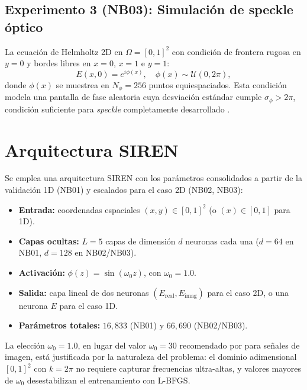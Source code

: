 \subsection{Experimento 3 (NB03): Simulación de speckle óptico}

La ecuación de Helmholtz 2D en $\Omega = [0,1]^2$ con condición de frontera
rugosa en $y = 0$ y bordes libres en $x = 0$, $x = 1$ e $y = 1$:
%
\begin{equation}
    E(x, 0) = e^{i\phi(x)}, \quad
    \phi(x) \sim \mathcal{U}(0, 2\pi),
    \label{eq:frontera_rugosa}
\end{equation}
%
donde $\phi(x)$ se muestrea en $N_\phi = 256$ puntos equiespaciados. Esta
condición modela una pantalla de fase aleatoria cuya desviación estándar cumple
$\sigma_\phi > 2\pi$, condición suficiente para \textit{speckle} completamente
desarrollado \parencite{goodman2007speckle, fang2020physics}.

\section{Arquitectura SIREN}

Se emplea una arquitectura SIREN con los parámetros consolidados a partir de la
validación 1D (NB01) y escalados para el caso 2D (NB02, NB03):

\begin{itemize}
    \item \textbf{Entrada:} coordenadas espaciales $(x, y) \in [0,1]^2$ (o
    $(x) \in [0,1]$ para 1D).
    \item \textbf{Capas ocultas:} $L = 5$ capas de dimensión $d$ neuronas cada
    una ($d = 64$ en NB01, $d = 128$ en NB02/NB03).
    \item \textbf{Activación:} $\phi(z) = \sin(\omega_0 z)$, con $\omega_0 = 1.0$.
    \item \textbf{Salida:} capa lineal de dos neuronas $(E_\text{real}, E_\text{imag})$
    para el caso 2D, o una neurona $E$ para el caso 1D.
    \item \textbf{Parámetros totales:} $16{,}833$ (NB01) y $66{,}690$ (NB02/NB03).
\end{itemize}

La elección $\omega_0 = 1.0$, en lugar del valor $\omega_0 = 30$ recomendado
por \textcite{sitzmann2020siren} para señales de imagen, está justificada por la
naturaleza del problema: el dominio adimensional $[0,1]^2$ con $k = 2\pi$ no
requiere capturar frecuencias ultra-altas, y valores mayores de $\omega_0$
desestabilizan el entrenamiento con L-BFGS.

